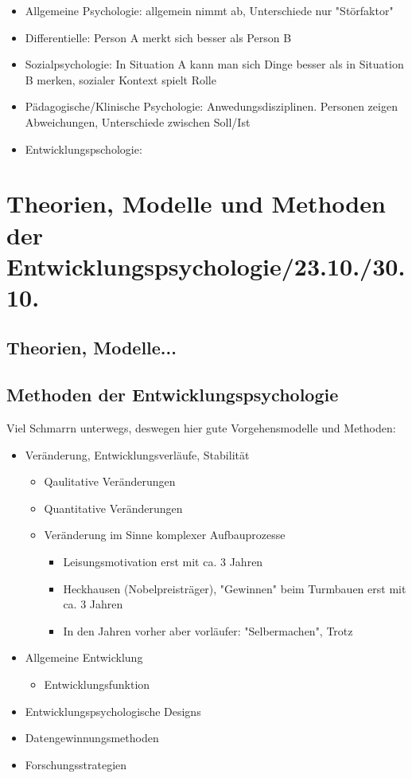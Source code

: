 \documentclass[a4paper]{scrartcl}
\begin{document}
\begin{itemize}
\begin{itemize}
				\begin{itemize}
			\item Allgemeine Psychologie: allgemein nimmt ab, Unterschiede nur "Störfaktor"
					\item Differentielle: Person A merkt sich besser als Person B
						\item
							Sozialpsychologie: In Situation A kann man sich Dinge besser als in Situation B merken, sozialer Kontext spielt Rolle
							\item Pädagogische/Klinische Psychologie: Anwedungsdisziplinen. Personen zeigen Abweichungen, Unterschiede zwischen Soll/Ist
								\item Entwicklungspschologie: 

				\end{itemize}
		\end{itemize}
\end{itemize}
\section{Theorien, Modelle und Methoden der Entwicklungspsychologie/23.10./30.10.}
\subsection{Theorien, Modelle...}
\subsection{Methoden der Entwicklungspsychologie}
Viel Schmarrn unterwegs, deswegen hier gute Vorgehensmodelle und Methoden:
\begin{itemize}
	\item
		Veränderung, Entwicklungsverläufe, Stabilität
		\begin{itemize}
			\item
				Qaulitative Veränderungen
			\item
				Quantitative Veränderungen
			\item
				Veränderung im Sinne komplexer Aufbauprozesse
				\begin{itemize}
					\item
						Leisungsmotivation erst mit ca. 3 Jahren
					\item
						Heckhausen (Nobelpreisträger), "Gewinnen" beim Turmbauen erst mit ca. 3 Jahren
					\item
						In den Jahren vorher aber vorläufer: "Selbermachen", Trotz
				\end{itemize}
		\end{itemize}
		\item
			Allgemeine Entwicklung
			\begin{itemize}
				\item
					Entwicklungsfunktion
			\end{itemize}
	\item
		Entwicklungspsychologische Designs
	\item
		Datengewinnungsmethoden
	\item
		Forschungsstrategien
\end{itemize}
\end{document}
